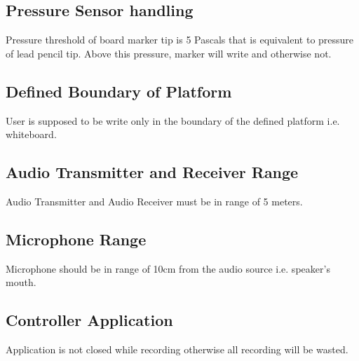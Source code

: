 \subsection{Pressure Sensor handling}
Pressure threshold of board marker tip is 5 Pascals that is equivalent to pressure of lead pencil tip. Above this pressure, marker will write and otherwise not.
\bigskip

\subsection{Defined Boundary of Platform}
User is supposed to be write only in the boundary of the defined platform i.e. whiteboard. 
\bigskip

\subsection{Audio Transmitter and Receiver Range}
Audio Transmitter and Audio Receiver must be in range of 5 meters.
\bigskip

\subsection{Microphone Range}
Microphone should be in range of 10cm from the audio source i.e. speaker's mouth.
\bigskip

\subsection{Controller Application}
Application is not closed while recording otherwise all recording will be wasted.
\bigskip







